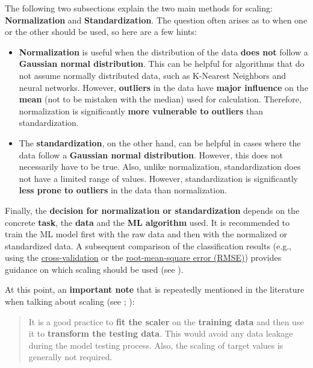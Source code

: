 \documentclass [oneside,10pt,a4paper,ngerman,BCOR10mm,headsepline,parindent,final]{scrartcl}
\providecommand{\tightlist}{%
      \setlength{\itemsep}{0pt}\setlength{\parskip}{0pt}}
\begin{document}
The following two subsections explain the two main methods for scaling:
\textbf{Normalization} and \textbf{Standardization}. The question often
arises as to when one or the other should be used, so here are a few
hints:

\begin{itemize}
\tightlist
\item
  \textbf{Normalization} is useful when the distribution of the data
  \textbf{does not} follow a \textbf{Gaussian normal distribution}. This
  can be helpful for algorithms that do not assume normally distributed
  data, such as K-Nearest Neighbors and neural networks. However,
  \textbf{outliers} in the data have \textbf{major influence} on the
  \textbf{mean} (not to be mistaken with the median) used for
  calculation. Therefore, normalization is significantly \textbf{more
  vulnerable to outliers} than standardization.
\item
  The \textbf{standardization}, on the other hand, can be helpful in
  cases where the data follow a \textbf{Gaussian normal distribution}.
  However, this does not necessarily have to be true. Also, unlike
  normalization, standardization does not have a limited range of
  values. However, standardization is significantly \textbf{less prone
  to outliers} in the data than normalization.
\end{itemize}

Finally, the \textbf{decision for normalization or standardization}
depends on the concrete \textbf{task}, the \textbf{data} and the
\textbf{ML algorithm} used. It is recommended to train the ML model
first with the raw data and then with the normalized or standardized
data. A subsequent comparison of the classification results (e.g., using
the
\href{https://en.wikipedia.org/wiki/Cross-validation_(statistics)}{cross-validation}
or the
\href{https://en.wikipedia.org/wiki/Root-mean-square_deviation}{root-mean-square
error (RMSE)}) provides guidance on which scaling should be used (see
\cite{feature_scaling_2020}).

At this point, an \textbf{important note} that is repeatedly mentioned
in the literature when talking about scaling (see
\cite{feature_scaling_2020}; \cite{Geron_2018}):

\begin{quote}
It is a good practice to \textbf{fit the scaler} on the \textbf{training
data} and then use it to \textbf{transform the testing data}. This would
avoid any data leakage during the model testing process. Also, the
scaling of target values is generally not required.
\end{quote}
\end{document}

